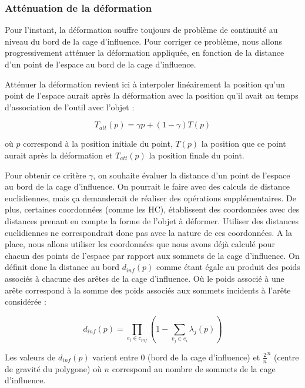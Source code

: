 \subsubsection{Atténuation de la déformation}

Pour l'instant, la déformation souffre toujours de problème de continuité au
niveau du bord de la cage d'influence. Pour corriger ce problème, nous allons
progressivement atténuer la déformation appliquée, en fonction de la distance
d'un point de l'espace au bord de la cage d'influence.

Atténuer la déformation revient ici à interpoler linéairement la position
qu'un point de l'espace aurait après la déformation avec la position qu'il
avait au temps d'association de l'outil avec l'objet :

\begin{equation}
  T_{att}(p) = \gamma p + (1-\gamma) T(p)
\end{equation}

où $p$ correspond à la position initiale du point, $T(p)$ la position que ce
point aurait après la déformation et $T_{att}(p)$ la position finale du point.

Pour obtenir ce critère $\gamma$, on souhaite évaluer la distance d'un point
de l'espace au bord de la cage d'influence. On pourrait le faire avec des
calculs de distance euclidiennes, mais ça demanderait de réaliser des
opérations supplémentaires. De plus, certaines coordonnées (comme les HC),
établissent des coordonnées avec des distances prenant en compte la forme de
l'objet à déformer. Utiliser des distances euclidiennes ne correspondrait donc
pas avec la nature de ces coordonnées. A la place, nous allons utiliser les
coordonnées que nous avons déjà calculé pour chacun des points de l'espace par
rapport aux sommets de la cage d'influence. On définit donc la distance au
bord $d_{inf}(p)$ comme étant égale au produit des poids associés à chacune
des arêtes de la cage d'influence. Où le poids associé à une arête correspond
à la somme des poids associés aux sommets incidents à l'arête considérée :

\begin{equation}
  d_{inf}(p) = \prod_{e_i \in c_{inf}} (1 - \sum_{v_j \in e_i} \lambda_j(p))
\end{equation}

Les valeurs de $d_{inf}(p)$ varient entre 0 (bord de la cage d'influence) et
$\frac{2}{n}^n$ (centre de gravité du polygone) où $n$ correspond au nombre de
sommets de la cage d'influence.

